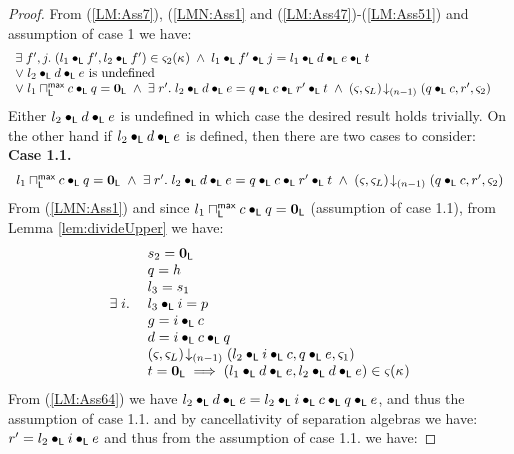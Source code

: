 \begin{lemma}[]
\begin{proof}
%
From (\ref{LM:Ass7}), (\ref{LMN:Ass1} and (\ref{LM:Ass47})-(\ref{LM:Ass51}) and assumption of case 1 we have:
%
\begin{align}
	&\begin{array}{l}
		\exists\; f', j.\;(l_1 \bullet_{\textsf{L}} f', l_2 \bullet_{\textsf{L}} f') \in \varsigma_{2}(\kappa_{}) \;\land\; l_1 \bullet_{\textsf{L}} f' \bullet_{\textsf{L}} j = l_1 \bullet_{\textsf{L}} d \bullet_{\textsf{L}} e \bullet_{\textsf{L}} t \\
		\lor\; l_2 \bullet_{\textsf{L}} d \bullet_{\textsf{L}} e \text{ is undefined}\\
		\lor\; l_1 \sqcap_{\textsf{L}}^{\textsf{max}} c \bullet_{\textsf{L}} q = \mathbf{0}_{\textsf{L}} \;\land\; \exists\; r'.\; l_2 \bullet_{\textsf{L}} d \bullet_{\textsf{L}} e = q \bullet_{\textsf{L}} c \bullet_{\textsf{L}} r' \bullet_{\textsf{L}} t \;\land\; \left(\varsigma_{}, \varsigma_{L}\right) \!\downarrow_{(n-1)} \left(q\bullet_{\textsf{L}} c, r', \varsigma_{2}\right)
	\end{array} \nonumber
\end{align}
%
Either $l_2 \bullet_{\textsf{L}} d \bullet_{\textsf{L}} e $ is undefined in which case the desired result holds trivially. On the other hand if $l_2 \bullet_{\textsf{L}} d \bullet_{\textsf{L}} e$ is defined, then there are two cases to consider:\\
\textbf{Case 1.1.} 
\[
\begin{array}{l}
		l_1 \sqcap_{\textsf{L}}^{\textsf{max}} c \bullet_{\textsf{L}} q = \mathbf{0}_{\textsf{L}} \;\land\;  \exists\; r'.\; l_2 \bullet_{\textsf{L}} d \bullet_{\textsf{L}} e = q \bullet_{\textsf{L}} c \bullet_{\textsf{L}} r' \bullet_{\textsf{L}} t \;\land\; \left(\varsigma_{}, \varsigma_{L}\right) \!\downarrow_{(n-1)} \left(q\bullet_{\textsf{L}} c, r', \varsigma_{2}\right)
\end{array}
\]
%
From  (\ref{LMN:Ass1}) and since $l_1 \sqcap_{\textsf{L}}^{\textsf{max}} c \bullet_{\textsf{L}} q = \mathbf{0}_{\textsf{L}}$ (assumption of case 1.1), from Lemma \ref{lem:divideUpper} we have:
%
\begin{align}
	\begin{array}{l l}
		& s_2 = \mathbf{0}_{\textsf{L}}\\
		& q = h\\
		& l_3 = s_1\\
		\exists\; i.\; & l_3 \bullet_{\textsf{L}} i = p\\
		& g =  i \bullet_{\textsf{L}} c\\
		& d = i \bullet_{\textsf{L}} c \bullet_{\textsf{L}} q\\
		& \left(\varsigma_{}, \varsigma_{L}\right) \!\downarrow_{(n-1)} \left(l_2 \bullet_{\textsf{L}} i \bullet_{\textsf{L}} c, q \bullet_{\textsf{L}} e, \varsigma_{1}\right)\\
		& t = \mathbf{0}_{\textsf{L}} \implies (l_1 \bullet_{\textsf{L}} d \bullet_{\textsf{L}} e, l_2 \bullet_{\textsf{L}} d \bullet_{\textsf{L}} e) \in \varsigma_{}(\kappa_{})
	\end{array}\label{LM:Ass64}
\end{align}
%
From (\ref{LM:Ass64}) we have $l_2 \bullet_{\textsf{L}} d \bullet_{\textsf{L}} e = l_2 \bullet_{\textsf{L}} i \bullet_{\textsf{L}} c \bullet_{\textsf{L}} q \bullet_{\textsf{L}} e$, and thus the assumption of case 1.1. and by cancellativity of separation algebras we have: $r' = l_2 \bullet_{\textsf{L}} i \bullet_{\textsf{L}} e$ and thus from the assumption of case 1.1. we have:

\end{proof}
\end{lemma}
